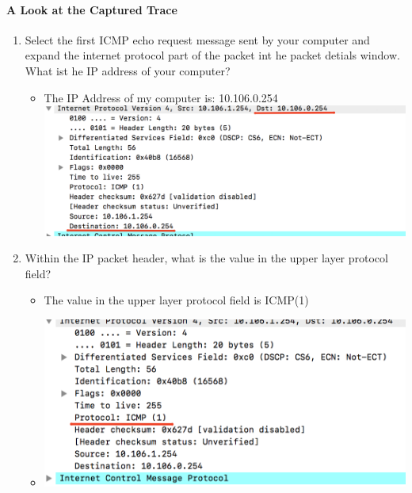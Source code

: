 \documentclass{article}
\begin{document}
\paragraph{A Look at the Captured Trace}
  \begin{enumerate}
    \item Select the first ICMP echo request message sent by your computer and expand the internet protocol part of the packet int he packet detials window.  What ist he IP address of your computer?
            \begin{itemize}
            \item The IP Address of my computer is: 10.106.0.254
            \includegraphics[scale=0.3]{images/IP1.png}
          \end{itemize}

      \item Within the IP packet header, what is the value in the upper layer protocol field?
          \begin{itemize}
            \item The value in the upper layer protocol field is ICMP(1)
            \item \includegraphics[scale=0.5]{images/IP2.png}
          \end{itemize}


\end{enumerate}
\end{document}
